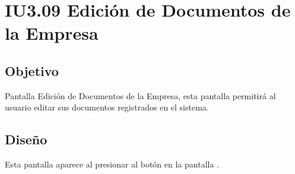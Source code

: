 \newpage
\section{IU3.09 Edición de Documentos de la Empresa}

\subsection{Objetivo}
	Pantalla Edición de Documentos de la Empresa, esta pantalla permitirá al usuario editar sus documentos registrados en el sistema.
	


\subsection{Diseño}
	Esta pantalla aparece al presionar al botón  en la pantalla  .

	
